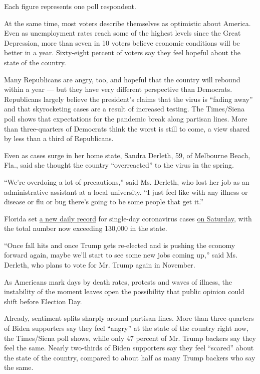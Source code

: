 Each figure represents one poll respondent.

At the same time, most voters describe themselves as optimistic about
America. Even as unemployment rates reach some of the highest levels
since the Great Depression, more than seven in 10 voters believe
economic conditions will be better in a year. Sixty-eight percent of
voters say they feel hopeful about the state of the country.

Many Republicans are angry, too, and hopeful that the country will
rebound within a year --- but they have very different perspective than
Democrats. Republicans largely believe the president's claims that the
virus is ``fading away'' and that skyrocketing cases are a result of
increased testing. The Times/Siena poll shows that expectations for the
pandemic break along partisan lines. More than three-quarters of
Democrats think the worst is still to come, a view shared by less than a
third of Republicans.

Even as cases surge in her home state, Sandra Derleth, 59, of Melbourne
Beach, Fla., said she thought the country ``overreacted'' to the virus
in the spring.

``We're overdoing a lot of precautions,'' said Ms. Derleth, who lost her
job as an administrative assistant at a local university. ``I just feel
like with any illness or disease or flu or bug there's going to be some
people that get it.''

Florida set
\href{https://www.nytimes3xbfgragh.onion/interactive/2020/us/florida-coronavirus-cases.html}{a
new daily record} for single-day coronavirus cases
\href{https://www.nytimes3xbfgragh.onion/2020/06/27/world/coronavirus-updates.html?action=click\&module=Spotlight\&pgtype=Homepage}{on
Saturday}, with the total number now exceeding 130,000 in the state.

``Once fall hits and once Trump gets re-elected and is pushing the
economy forward again, maybe we'll start to see some new jobs coming
up,'' said Ms. Derleth, who plans to vote for Mr. Trump again in
November.

As Americans mark days by death rates, protests and waves of illness,
the instability of the moment leaves open the possibility that public
opinion could shift before Election Day.

Already, sentiment splits sharply around partisan lines. More than
three-quarters of Biden supporters say they feel ``angry'' at the state
of the country right now, the Times/Siena poll shows, while only 47
percent of Mr. Trump backers say they feel the same. Nearly two-thirds
of Biden supporters say they feel ``scared'' about the state of the
country, compared to about half as many Trump backers who say the same.

